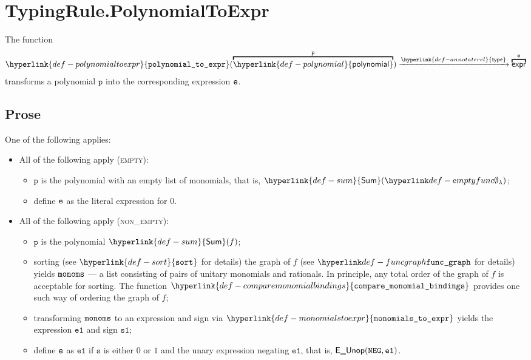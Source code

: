 \documentclass{book}
\newcommand\annotaterel[0]{\hyperlink{def-annotaterel}{\textsf{type}}}
\newcommand\typearrow[0]{\xrightarrow{\annotaterel}}
\newcommand\sort[0]{\hyperlink{def-sort}{\texttt{sort}}}
\newcommand\comparemonomialbindings[0]{\hyperlink{def-comparemonomialbindings}{\texttt{compare\_monomial\_bindings}}}
\newcommand\polynomialtoexpr[0]{\hyperlink{def-polynomialtoexpr}{\texttt{polynomial\_to\_expr}}}
\newcommand\monomialstoexpr[0]{\hyperlink{def-monomialstoexpr}{\texttt{monomials\_to\_expr}}}
\newcommand\Sum[0]{\hyperlink{def-sum}{\textsf{Sum}}}
\newcommand\polynomial[0]{\hyperlink{def-polynomial}{\textsf{polynomial}}}
\newcommand\vp[0]{\texttt{p}}
\newcommand\veone[0]{\texttt{e1}}
\newcommand\vs[0]{\texttt{s}}
\newcommand\vsone[0]{\texttt{s1}}
\begin{document}
\section{TypingRule.PolynomialToExpr \label{sec:TypingRule.PolynomialToExpr}}
\hypertarget{def-polynomialtoexpr}{}
The function
\[
\polynomialtoexpr(\overname{\polynomial}{\vp}) \typearrow \overname{\expr}{\ve}
\]
transforms a polynomial $\vp$ into the corresponding expression $\texttt{e}$.

\subsection{Prose}
One of the following applies:
\begin{itemize}
  \item All of the following apply (\textsc{empty}):
  \begin{itemize}
    \item $\vp$ is the polynomial with an empty list of monomials, that is, $\Sum(\emptyfunc)$;
    \item define $\texttt{e}$ as the literal expression for $0$.
  \end{itemize}

  \item All of the following apply (\textsc{non\_empty}):
  \begin{itemize}
    \item $\vp$ is the polynomial $\Sum(f)$;
    \item sorting (see $\sort$ for details) the graph of $f$ (see $\funcgraph$ for details)
          yields $\texttt{monoms}$ --- a list consisting of pairs of unitary monomials and rationals.
          In principle, any total order of the graph of $f$ is acceptable for sorting.
          The function $\comparemonomialbindings$ provides one such way of ordering
          the graph of $f$;
    \item transforming $\texttt{monoms}$ to an expression and sign via $\monomialstoexpr$ yields the expression $\veone$
          and sign $\vsone$;
    \item define $\texttt{e}$ as $\veone$ if $\vs$ is either $0$ or $1$ and the unary expression negating $\veone$, that is,
          $\EUnop(\NEG, \veone)$.
  \end{itemize}
\end{itemize}
\end{document}
